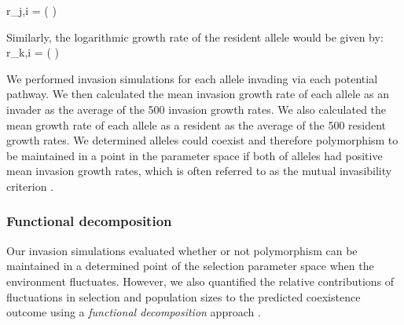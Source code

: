 \documentclass[12pt]{article}
\let\oldequation\equation
\let\oldendequation\endequation
\renewenvironment{equation}
  {\linenomathNonumbers\oldequation}
  {\oldendequation\endlinenomath}
\begin{document}
\begin{equation}
r_{j,i} =	\ln \left (  \right )
\label{invader}
\end{equation}

Similarly, the logarithmic growth rate of the resident allele would be given by:
\begin{equation}
r_{k,i} =	\ln \left (  \right )
\label{resident}
\end{equation}

We performed invasion simulations for each allele invading via  each potential pathway. We then calculated the mean invasion growth rate of each allele as an invader as the average of the 500 invasion growth rates. We also calculated the mean growth rate of each allele as a resident as the average of the 500 resident growth rates. We determined alleles could coexist  and therefore polymorphism to be maintained in a point in the parameter space if both of alleles had positive mean invasion growth rates, which is often referred to as the mutual invasibility criterion \citep{barabas_chessons_2018}.


\subsubsection*{Functional decomposition}


Our invasion simulations evaluated whether or not polymorphism can be maintained in a determined point of the selection parameter space when the environment fluctuates. However, we also quantified the relative contributions of fluctuations in selection and population sizes to the predicted coexistence outcome using a \textit{functional decomposition} approach \citep{ellner2016quantify,ellner_expanded_2019, shoemaker2020}.

\end{document}
